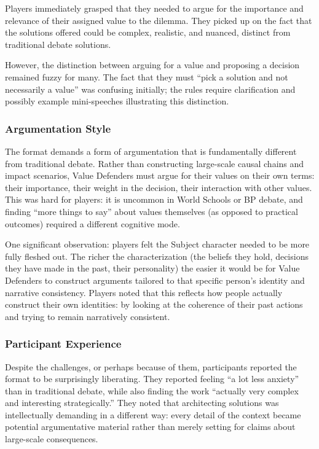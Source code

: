 Players immediately grasped that they needed to argue for the importance and relevance of their assigned value to the dilemma. They picked up on the fact that the solutions offered could be complex, realistic, and nuanced, distinct from traditional debate solutions.

However, the distinction between arguing for a value and proposing a decision remained fuzzy for many. The fact that they must ``pick a solution and not necessarily a value'' was confusing initially; the rules require clarification and possibly example mini-speeches illustrating this distinction.

\subsubsection{Argumentation Style}

The format demands a form of argumentation that is fundamentally different from traditional debate. Rather than constructing large-scale causal chains and impact scenarios, Value Defenders must argue for their values on their own terms: their importance, their weight in the decision, their interaction with other values. This was hard for players: it is uncommon in World Schools or BP debate, and finding ``more things to say'' about values themselves (as opposed to practical outcomes) required a different cognitive mode.

One significant observation: players felt the Subject character needed to be more fully fleshed out. The richer the characterization (the beliefs they hold, decisions they have made in the past, their personality) the easier it would be for Value Defenders to construct arguments tailored to that specific person's identity and narrative consistency. Players noted that this reflects how people actually construct their own identities: by looking at the coherence of their past actions and trying to remain narratively consistent.

\subsubsection{Participant Experience}

Despite the challenges, or perhaps because of them, participants reported the format to be surprisingly liberating. They reported feeling ``a lot less anxiety'' than in traditional debate, while also finding the work ``actually very complex and interesting strategically.'' They noted that architecting solutions was intellectually demanding in a different way: every detail of the context became potential argumentative material rather than merely setting for claims about large-scale consequences.

